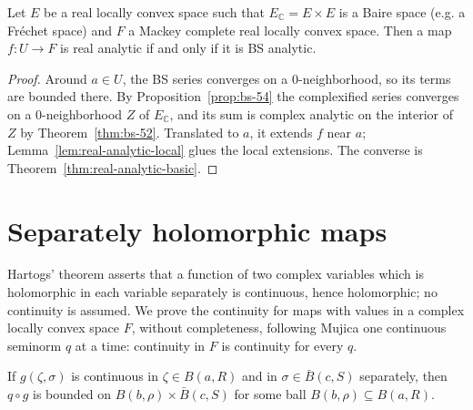 \begin{theorem}
  \label{thm:bs-71}
  \leanok
  Let $E$ be a real locally convex space such that $E_{\mathbb{C}} = E \times E$ is a Baire space
  (e.g. a Fréchet space) and $F$ a Mackey complete real locally convex space. Then a map
  $f \colon U \to F$ is real analytic if and only if it is BS analytic.
\end{theorem}

\begin{proof}
  \leanok
  Around $a \in U$, the BS series converges on a $0$-neighborhood, so its terms are bounded
  there. By Proposition~\ref{prop:bs-54} the complexified series converges on a
  $0$-neighborhood $Z$ of $E_{\mathbb{C}}$, and its sum is complex analytic on the interior of $Z$
  by Theorem~\ref{thm:bs-52}. Translated to $a$, it extends $f$ near $a$; Lemma~\ref{lem:real-analytic-local}
  glues the local extensions. The converse is Theorem~\ref{thm:real-analytic-basic}.
\end{proof}

\section{Separately holomorphic maps}

Hartogs' theorem asserts that a function of two complex variables which is holomorphic in each
variable separately is continuous, hence holomorphic; no continuity is assumed. We prove the
continuity for maps with values in a complex locally convex space $F$, without completeness,
following Mujica \cite[\S36]{Muj86} one continuous seminorm $q$ at a time: continuity in $F$ is
continuity for every $q$.

\begin{lemma}
  \label{lem:sep-baire}
  \leanok
  If $g(\zeta, \sigma)$ is continuous in $\zeta \in B(a, R)$ and in $\sigma \in \bar B(c, S)$
  separately, then $q \circ g$ is bounded on $B(b, \rho) \times \bar B(c, S)$ for some ball
  $B(b, \rho) \subseteq B(a, R)$.
\end{lemma}


